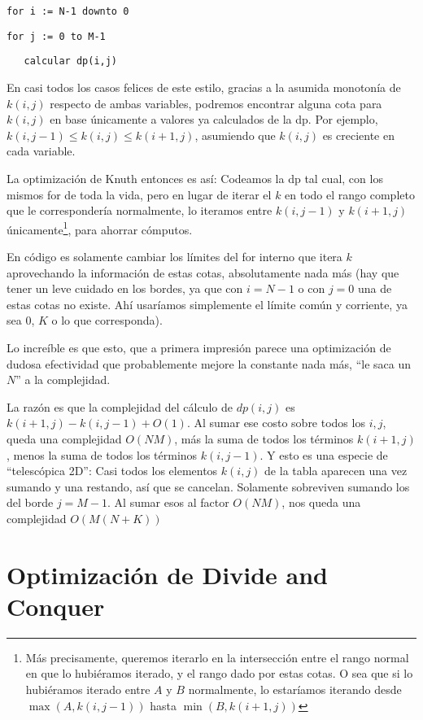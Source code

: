 \documentclass{article}
\begin{document}
\texttt{for i := N-1 downto 0}

\texttt{for j := 0 to M-1}

\texttt{\ \ \ calcular dp(i,j)}

En casi todos los casos felices de este estilo, gracias a la asumida monotonía de $k(i,j)$ respecto de ambas variables, podremos encontrar alguna cota para $k(i,j)$ en base
únicamente a valores ya calculados de la dp. Por ejemplo, $k(i,j-1) \leq k(i,j) \leq k(i+1,j)$, asumiendo que $k(i,j)$ es creciente en cada variable.

La optimización de Knuth entonces es así: Codeamos la dp tal cual, con los mismos for de toda la vida, pero en lugar de iterar el $k$ en todo el rango
completo que le correspondería normalmente, lo iteramos entre $k(i,j-1)$ y $k(i+1,j)$ únicamente\footnote{Más precisamente, queremos iterarlo
en la intersección entre el rango normal en que lo hubiéramos iterado, y el rango dado por estas cotas. O sea que si lo hubiéramos iterado entre $A$ y $B$ normalmente, lo estaríamos iterando desde $\max(A, k(i,j-1))$ hasta $\min(B, k(i+1,j))$}, para ahorrar cómputos.

En código es solamente
cambiar los límites del for interno que itera $k$ aprovechando la información de estas cotas, absolutamente nada más (hay que tener un leve cuidado en los bordes, ya que con $i=N-1$ o con $j=0$
una de estas cotas no existe. Ahí usaríamos simplemente el límite común y corriente, ya sea $0$, $K$ o lo que corresponda).

Lo increíble es que esto, que a primera impresión parece una optimización de dudosa efectividad que probablemente mejore la constante nada más, ``le saca un $N$'' a la complejidad.

La razón es que la complejidad del cálculo de $dp(i,j)$ es $k(i+1,j) - k(i,j-1) + O(1)$. Al sumar ese costo sobre todos los $i,j$, queda una complejidad $O(NM)$, más la suma de todos
los términos $k(i+1,j)$, menos la suma de todos los términos $k(i,j-1)$. Y esto es una especie de ``telescópica 2D'': Casi todos los elementos $k(i,j)$
de la tabla aparecen una vez sumando y una restando, así que se cancelan. Solamente sobreviven sumando los del borde $j=M-1$. Al sumar esos al factor $O(NM)$, nos queda una complejidad $O(M(N+K))$ 

\section{Optimización de Divide and Conquer}
\end{document}
